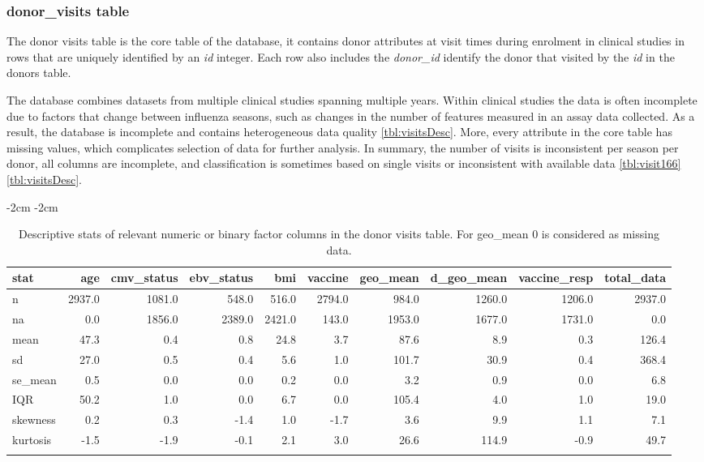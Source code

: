 \subsubsection{donor\_visits table}

The donor visits table is the core table of the database, it contains donor attributes at visit times during enrolment in clinical studies in rows that are uniquely identified by an \textit{id} integer.
Each row also includes the \textit{donor\_id} identify the donor that visited by the \textit{id} in the donors table.

The database combines datasets from multiple clinical studies spanning multiple years.
Within clinical studies the data is often incomplete due to factors that change between influenza seasons, such as changes in the number of features measured in an assay data collected.
As a result, the \flup database is incomplete and contains heterogeneous data quality \autoref{tbl:visitsDesc}.
More, every attribute in the core table has missing values, which complicates selection of data for further analysis.
In summary, the number of visits is inconsistent per season per donor, all columns are incomplete, and classification is sometimes based on single visits or inconsistent with available data \autoref{tbl:visit166} \autoref{tbl:visitsDesc}.

\begin{table}[htpb]
\addtolength{\leftskip} {-2cm} %
\addtolength{\rightskip} {-2cm} %
\begin{tabular}{lrrrrrrrrr}
\toprule{}
stat & age & cmv\_status & ebv\_status & bmi & vaccine & geo\_mean & d\_geo\_mean & vaccine\_resp & total\_data\\
\midrule{}
n & 2937.0 & 1081.0 & 548.0 & 516.0 & 2794.0 & 984.0 & 1260.0 & 1206.0 & 2937.0\\
na & 0.0 & 1856.0 & 2389.0 & 2421.0 & 143.0 & 1953.0 & 1677.0 & 1731.0 & 0.0\\
mean & 47.3 & 0.4 & 0.8 & 24.8 & 3.7 & 87.6 & 8.9 & 0.3 & 126.4\\
sd & 27.0 & 0.5 & 0.4 & 5.6 & 1.0 & 101.7 & 30.9 & 0.4 & 368.4\\
se\_mean & 0.5 & 0.0 & 0.0 & 0.2 & 0.0 & 3.2 & 0.9 & 0.0 & 6.8\\
\addlinespace
IQR & 50.2 & 1.0 & 0.0 & 6.7 & 0.0 & 105.4 & 4.0 & 1.0 & 19.0\\
skewness & 0.2 & 0.3 & -1.4 & 1.0 & -1.7 & 3.6 & 9.9 & 1.1 & 7.1\\
kurtosis & -1.5 & -1.9 & -0.1 & 2.1 & 3.0 & 26.6 & 114.9 & -0.9 & 49.7\\
\bottomrule{}
\end{tabular}
\caption{
    Descriptive stats of relevant numeric or binary factor columns in the donor visits table.
    For geo\_mean 0 is considered as missing data.}\label{tbl:visitsDesc}
\end{table}

